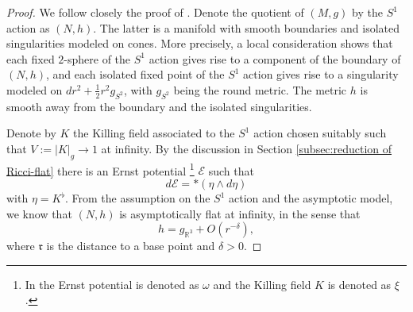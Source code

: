 \documentclass[a4paper,11pt]{amsart}
\theoremstyle{definition}
\numberwithin{equation}{section}
\begin{document}
\begin{proof}
    We follow closely the proof of \cite{MarsSimon}.
 Denote the quotient of $(M,g)$ by the $S^1$ action as $(N,h)$. The latter is a manifold with smooth boundaries and isolated singularities modeled on cones. More precisely, a local consideration shows that each fixed $2$-sphere of the $S^1$ action gives rise to a component of the boundary of $(N,h)$, and each isolated fixed point of the $S^1$ action gives rise to a  singularity modeled on $dr^2+\frac{1}{2}r^2g_{S^2}$, with $g_{S^2}$ being the round metric.   The metric $h$ is smooth away from the boundary and the isolated  singularities. 
 
 Denote by $K$ the Killing field associated to the $S^1$ action chosen suitably such that $V:=|K|_g\to1$ at infinity. By the discussion in Section \ref{subsec:reduction of Ricci-flat} there is an Ernst potential \footnote{In \cite{MarsSimon} the Ernst potential is denoted as $\omega$ and the Killing field $K$ is denoted as $\xi$.} $\mathcal{E}$  such that
    $$d\mathcal{E}=*(\eta\wedge d\eta)$$
    with $\eta=K^\flat$. From the assumption on the $S^1$ action and the asymptotic model, we know that $(N,h)$ is asymptotically flat at infinity, in the sense that $$h=g_{\mathbb{R}^3}+O(r^{-\delta}),$$ where $\mathfrak{r}$ is the distance to a base point and $\delta>0$.


\end{proof}
\end{document}
